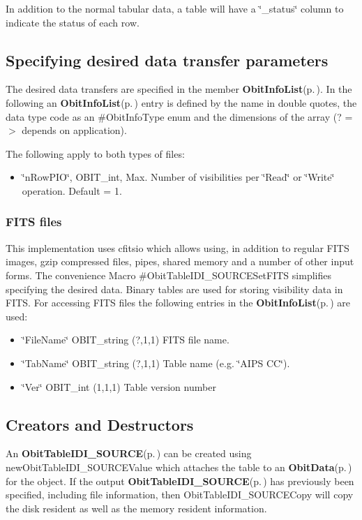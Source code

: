 In addition to the normal tabular data, a table will have a \char`\"{}\_\-status\char`\"{} column to indicate the status of each row.\subsection{Specifying desired data transfer parameters}\label{ObitTableIDI__SOURCE_8h_ObitTableIDI_SOURCESpecification}
The desired data transfers are specified in the member {\bf Obit\-Info\-List}{\rm (p.\,\pageref{structObitInfoList})}. In the following an {\bf Obit\-Info\-List}{\rm (p.\,\pageref{structObitInfoList})} entry is defined by the name in double quotes, the data type code as an \#Obit\-Info\-Type enum and the dimensions of the array (? =$>$ depends on application).

The following apply to both types of files: \begin{itemize}
\item \char`\"{}n\-Row\-PIO\char`\"{}, OBIT\_\-int, Max. Number of visibilities per \char`\"{}Read\char`\"{} or \char`\"{}Write\char`\"{} operation. Default = 1.\end{itemize}
\subsubsection{FITS files}\label{ObitTableWX_8h_TableFITS}
This implementation uses cfitsio which allows using, in addition to regular FITS images, gzip compressed files, pipes, shared memory and a number of other input forms. The convenience Macro \#Obit\-Table\-IDI\_\-SOURCESet\-FITS simplifies specifying the desired data. Binary tables are used for storing visibility data in FITS. For accessing FITS files the following entries in the {\bf Obit\-Info\-List}{\rm (p.\,\pageref{structObitInfoList})} are used: \begin{itemize}
\item \char`\"{}File\-Name\char`\"{} OBIT\_\-string (?,1,1) FITS file name. \item \char`\"{}Tab\-Name\char`\"{} OBIT\_\-string (?,1,1) Table name (e.g. \char`\"{}AIPS CC\char`\"{}). \item \char`\"{}Ver\char`\"{} OBIT\_\-int (1,1,1) Table version number\end{itemize}
\subsection{Creators and Destructors}\label{ObitTableIDI__SOURCE_8h_ObitTableIDI_SOURCEaccess}
An {\bf Obit\-Table\-IDI\_\-SOURCE}{\rm (p.\,\pageref{structObitTableIDI__SOURCE})} can be created using new\-Obit\-Table\-IDI\_\-SOURCEValue which attaches the table to an {\bf Obit\-Data}{\rm (p.\,\pageref{structObitData})} for the object. If the output {\bf Obit\-Table\-IDI\_\-SOURCE}{\rm (p.\,\pageref{structObitTableIDI__SOURCE})} has previously been specified, including file information, then Obit\-Table\-IDI\_\-SOURCECopy will copy the disk resident as well as the memory resident information.


